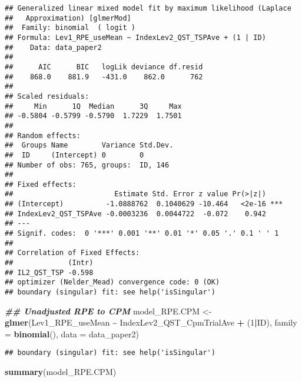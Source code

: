 \documentclass[
  12pt,
]{article}
\newenvironment{Shaded}{\begin{snugshade}}{\end{snugshade}}
\newcommand{\AttributeTok}[1]{\textcolor[rgb]{0.13,0.29,0.53}{#1}}
\newcommand{\DecValTok}[1]{\textcolor[rgb]{0.00,0.00,0.81}{#1}}
\newcommand{\DocumentationTok}[1]{\textcolor[rgb]{0.56,0.35,0.01}{\textbf{\textit{#1}}}}
\newcommand{\FunctionTok}[1]{\textcolor[rgb]{0.13,0.29,0.53}{\textbf{#1}}}
\newcommand{\NormalTok}[1]{#1}
\newcommand{\OtherTok}[1]{\textcolor[rgb]{0.56,0.35,0.01}{#1}}
\newcommand{\SpecialCharTok}[1]{\textcolor[rgb]{0.81,0.36,0.00}{\textbf{#1}}}
\begin{document}
\begin{verbatim}
## Generalized linear mixed model fit by maximum likelihood (Laplace
##   Approximation) [glmerMod]
##  Family: binomial  ( logit )
## Formula: Lev1_RPE_useMean ~ IndexLev2_QST_TSPAve + (1 | ID)
##    Data: data_paper2
## 
##      AIC      BIC   logLik deviance df.resid 
##    868.0    881.9   -431.0    862.0      762 
## 
## Scaled residuals: 
##     Min      1Q  Median      3Q     Max 
## -0.5804 -0.5799 -0.5790  1.7229  1.7501 
## 
## Random effects:
##  Groups Name        Variance Std.Dev.
##  ID     (Intercept) 0        0       
## Number of obs: 765, groups:  ID, 146
## 
## Fixed effects:
##                        Estimate Std. Error z value Pr(>|z|)    
## (Intercept)          -1.0888762  0.1040629 -10.464   <2e-16 ***
## IndexLev2_QST_TSPAve -0.0003236  0.0044722  -0.072    0.942    
## ---
## Signif. codes:  0 '***' 0.001 '**' 0.01 '*' 0.05 '.' 0.1 ' ' 1
## 
## Correlation of Fixed Effects:
##             (Intr)
## IL2_QST_TSP -0.598
## optimizer (Nelder_Mead) convergence code: 0 (OK)
## boundary (singular) fit: see help('isSingular')
\end{verbatim}

\begin{Shaded}
\begin{Highlighting}[]
\DocumentationTok{\#\# Unadjusted RPE to CPM}
\NormalTok{model\_RPE.CPM }\OtherTok{\textless{}{-}} \FunctionTok{glmer}\NormalTok{(Lev1\_RPE\_useMean }\SpecialCharTok{\textasciitilde{}}\NormalTok{ IndexLev2\_QST\_CpmTrialAve }\SpecialCharTok{+}\NormalTok{ (}\DecValTok{1}\SpecialCharTok{|}\NormalTok{ID), }\AttributeTok{family =} \FunctionTok{binomial}\NormalTok{(), }\AttributeTok{data =}\NormalTok{ data\_paper2)}
\end{Highlighting}
\end{Shaded}

\begin{verbatim}
## boundary (singular) fit: see help('isSingular')
\end{verbatim}

\begin{Shaded}
\begin{Highlighting}[]
\FunctionTok{summary}\NormalTok{(model\_RPE.CPM)}
\end{Highlighting}
\end{Shaded}
\end{document}
